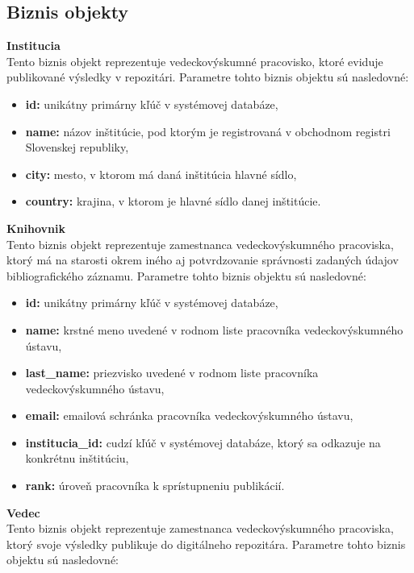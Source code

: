 \documentclass[10pt,oneside,slovak,a4paper]{article}
\begin{document}
\subsection{Biznis objekty}
\textbf{Institucia}\\
Tento biznis objekt reprezentuje vedeckovýskumné pracovisko, ktoré eviduje publikované výsledky v repozitári. Parametre tohto biznis objektu sú nasledovné:

\begin{itemize}
\item \textbf{id:} unikátny primárny kľúč v systémovej databáze,
\item \textbf{name:} názov inštitúcie, pod ktorým je registrovaná v obchodnom registri Slovenskej republiky,
\item \textbf{city:} mesto, v ktorom má daná inštitúcia hlavné sídlo,
\item \textbf{country:} krajina, v ktorom je hlavné sídlo danej inštitúcie.
\end{itemize}

\textbf{Knihovnik}\\
Tento biznis objekt reprezentuje zamestnanca vedeckovýskumného pracoviska, ktorý má na starosti okrem iného aj potvrdzovanie správnosti zadaných údajov bibliografického záznamu. Parametre tohto biznis objektu sú nasledovné:

\begin{itemize}
\item \textbf{id:} unikátny primárny kľúč v systémovej databáze,
\item \textbf{name:} krstné meno uvedené v rodnom liste pracovníka vedeckovýskumného ústavu,
\item \textbf{last\_name:} priezvisko uvedené v rodnom liste pracovníka vedeckovýskumného ústavu,
\item \textbf{email:} emailová schránka pracovníka vedeckovýskumného ústavu,
\item \textbf{institucia\_id:} cudzí kľúč v systémovej databáze, ktorý sa odkazuje na konkrétnu inštitúciu,
\item \textbf{rank:} úroveň pracovníka k sprístupneniu publikácií.
\end{itemize}

\textbf{Vedec}\\
Tento biznis objekt reprezentuje zamestnanca vedeckovýskumného pracoviska, ktorý svoje výsledky publikuje do digitálneho repozitára. Parametre tohto biznis objektu sú nasledovné:
\end{document}
